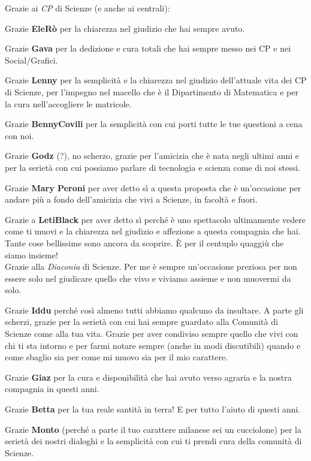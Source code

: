 

Grazie ai \textit{CP} di Scienze (e anche ai centrali):

Grazie \textbf{EleRò} per la chiarezza nel giudizio che hai sempre avuto.

Grazie \textbf{Gava} per la dedizione e cura totali che hai sempre messo nei CP e nei Social/Grafici.

Grazie \textbf{Lenny} per la semplicità e la chiarezza nel giudizio dell'attuale vita dei CP di Scienze, per l'impegno nel macello che è il Dipartimento di Matematica e per la cura nell'accogliere le matricole.

Grazie \textbf{BennyCovili} per la semplicità con cui porti tutte le tue questioni a cena con noi.

Grazie \textbf{Godz} (?), no scherzo, grazie per l'amicizia che è nata negli ultimi anni e per la serietà con cui possiamo parlare di tecnologia e scienza come di noi stessi.

Grazie \textbf{Mary Peroni} per aver detto sì a questa proposta che è un'occasione per andare più a fondo dell'amicizia che vivi a Scienze, in facoltà e fuori.

Grazie a \textbf{LetiBlack} per aver detto sì perché è uno spettacolo ultimamente vedere come ti muovi e la chiarezza nel giudizio e affezione a questa compagnia che hai. Tante cose bellissime sono ancora da scoprire. È per il centuplo quaggiù che siamo insieme! \\


Grazie alla \textit{Diaconia} di Scienze. Per me è sempre un'occasione preziosa per non essere solo nel giudicare quello che vivo e viviamo assieme e non muovermi da solo.

Grazie \textbf{Iddu} perché così almeno tutti abbiamo qualcuno da insultare. A parte gli scherzi, grazie per la serietà con cui hai sempre guardato alla Comunità di Scienze come alla tua vita. Grazie per aver condiviso sempre quello che vivi con chi ti sta intorno e per farmi notare sempre (anche in modi discutibili) quando e come sbaglio sia per come mi muovo sia per il mio carattere.

Grazie \textbf{Giaz} per la cura e disponibilità che hai avuto verso agraria e la nostra compagnia in questi anni.

Grazie \textbf{Betta} per la tua reale santità in terra! E per tutto l'aiuto di questi anni.

Grazie \textbf{Monto} (perché a parte il tuo carattere milanese sei un cucciolone) per la serietà dei nostri dialoghi e la semplicità con cui ti prendi cura della comunità di Scienze. 

